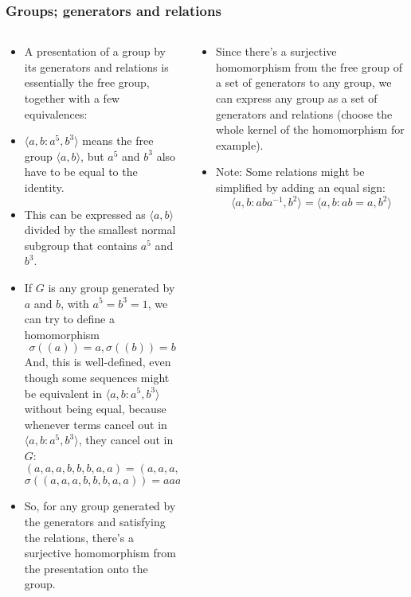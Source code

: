 \documentclass[8pt]{beamer}
\begin{document}
  \begin{frame}
    \frametitle{Groups; generators and relations}
    \begin{columns}
      \begin{column}[T]{0.5\textwidth}
        \begin{itemize}

          \item A presentation of a group by its generators and relations
            is essentially the free group, together with a few equivalences:
            \pause
          \item $\langle a,b:a^5,b^3\rangle $ means the free group $\langle a,b
            \rangle $, but $a^5$ and $b^3$ also have to be equal to the
            identity.\pause
          \item This can be expressed as $\langle a,b\rangle $ divided by the
            smallest normal subgroup that contains $a^5$ and $b^3$.\pause
          \item If $G$ is any group generated by $a$ and $b$, with
            $a^5 = b^3 = 1$, we can try to define a homomorphism
            \[\sigma((a)) = a, \sigma((b)) = b\]
            And, this is well-defined, even though some sequences might be
            equivalent in $\langle a,b:a^5,b^3\rangle $ without being equal,
            because whenever terms cancel out in $\langle a,b:a^5,b^3\rangle $,
            they cancel out in $G$:
            \[(a,a,a,b,b,b,a,a) = (a,a,a,a,a) = 1\]
            \[\sigma((a,a,a,b,b,b,a,a)) = aaabbbaa \in G = aaaaa = 1\]\pause
          \item So, for any group generated by the generators and satisfying the
            relations, there's a surjective homomorphism from the presentation
            onto the group.

        \end{itemize}
      \end{column}
      \begin{column}[T]{0.5\textwidth}
        \begin{itemize}
          \item Since there's a surjective homomorphism from the free group of a
            set of generators to any group, we can express any group as a set of
            generators and relations (choose the whole kernel of the
            homomorphism for example).\pause
          \item Note: Some relations might be simplified by adding an equal
            sign:
            \[\langle a,b:aba^{-1}, b^2\rangle  = \langle a,b:ab = a, b^2\rangle \]
        \end{itemize}
      \end{column}
    \end{columns}
  \end{frame}
\end{document}
